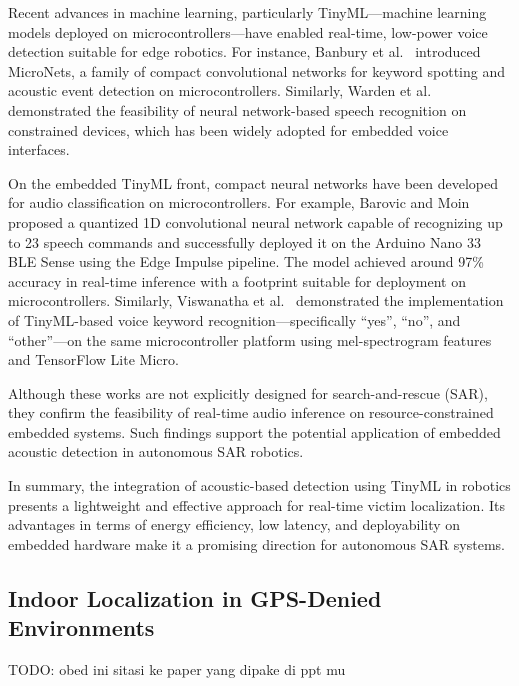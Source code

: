 Recent advances in machine learning, particularly TinyML—machine learning models deployed on microcontrollers—have enabled real-time, low-power voice detection suitable for edge robotics. For instance, Banbury et al.~\cite{Banbury2021micronets} introduced MicroNets, a family of compact convolutional networks for keyword spotting and acoustic event detection on microcontrollers. Similarly, Warden et al.~\cite{Warden2018speech} demonstrated the feasibility of neural network-based speech recognition on constrained devices, which has been widely adopted for embedded voice interfaces.

On the embedded TinyML front, compact neural networks have been developed for audio classification on microcontrollers. For example, Barovic and Moin~\cite{Barovic2025tinyml} proposed a quantized 1D convolutional neural network capable of recognizing up to 23 speech commands and successfully deployed it on the Arduino Nano 33 BLE Sense using the Edge Impulse pipeline. The model achieved around 97\% accuracy in real-time inference with a footprint suitable for deployment on microcontrollers. Similarly, Viswanatha et al.~\cite{Viswanatha2022tinyml} demonstrated the implementation of TinyML-based voice keyword recognition—specifically “yes”, “no”, and “other”—on the same microcontroller platform using mel-spectrogram features and TensorFlow Lite Micro.

Although these works are not explicitly designed for search-and-rescue (SAR), they confirm the feasibility of real-time audio inference on resource-constrained embedded systems. Such findings support the potential application of embedded acoustic detection in autonomous SAR robotics.

In summary, the integration of acoustic-based detection using TinyML in robotics presents a lightweight and effective approach for real-time victim localization. Its advantages in terms of energy efficiency, low latency, and deployability on embedded hardware make it a promising direction for autonomous SAR systems.

\subsection{Indoor Localization in GPS-Denied Environments}
TODO: obed \cite{WSNCentroid} ini sitasi ke paper yang dipake di ppt mu
